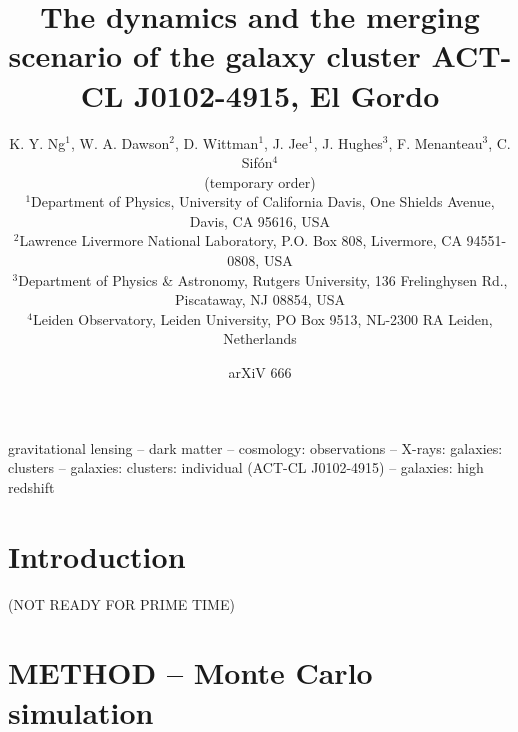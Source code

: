 


\title[El Gordo]{The dynamics and the merging scenario of the galaxy cluster 
ACT-CL J0102-4915, 
El Gordo}
\author[author]{K. Y. Ng$^{1}$, W. A. Dawson$^{2}$, D. Wittman$^{1}$, J.
Jee$^{1}$, J. Hughes$^{3}$, F. Menanteau$^{3}$, C. Sif\'{o}n$^{4}$\\
(temporary order)\\
$^{1}$Department of Physics, University of California Davis, One Shields
Avenue, Davis, CA 95616, USA\\ 
$^{2}$Lawrence Livermore National Laboratory, P.O. Box 808, Livermore, CA
94551-0808, USA \\
$^3$Department of Physics \& Astronomy,
Rutgers University, 136 Frelinghysen Rd., Piscataway, NJ 08854, USA\\
$^{4}$Leiden Observatory, Leiden University, PO Box 9513, NL-2300 RA
Leiden, Netherlands\\}



\date{arXiV 666} \pagerange{\pageref{firstpage}--\pageref{lastpage}}
 \maketitle \label{firstpage}
\begin{abstract} 
    
\end{abstract}
\begin{keywords}
gravitational lensing -- dark matter -- cosmology: observations -- X-rays:
galaxies: clusters -- galaxies: clusters: individual (ACT-CL J0102-4915) --
galaxies: high redshift 
\end{keywords}

\section{Introduction} 
(NOT READY FOR PRIME TIME)


\section[]{METHOD -- Monte Carlo simulation} 


